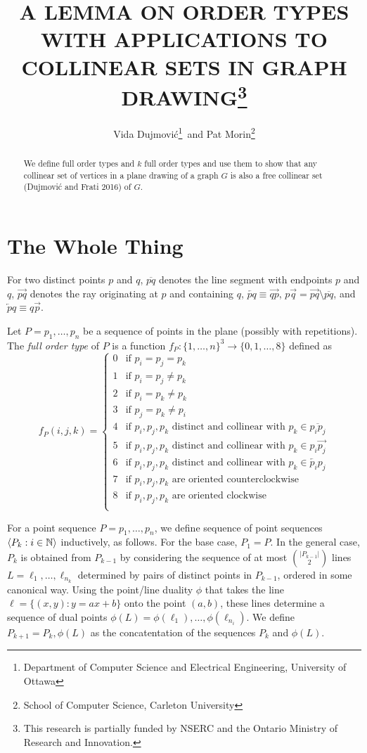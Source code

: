 \documentclass{patmorin}
\title{\MakeUppercase{A Lemma on Order Types with Applications to Collinear Sets in Graph Drawing}\thanks{This research is partially funded by NSERC and the Ontario Ministry of Research and Innovation.}}
\author{Vida Dujmovi\'c\thanks{Department of Computer Science and Electrical Engineering, University of Ottawa}\, and Pat Morin\thanks{School of Computer Science, Carleton University}}
\begin{document}
\maketitle


\begin{abstract}
  We define full order types and $k$ full order types and use them to
  show that any collinear set of vertices in a plane drawing of a graph
  $G$ is also a free collinear set (Dujmovi\'c and Frati 2016) of $G$.
\end{abstract}


\section{The Whole Thing}

For two distinct points $p$ and $q$,
$\overline{pq}$ denotes the line segment with endpoints $p$ and
$q$, $\overrightarrow{pq}$ denotes the ray originating at $p$ and
containing $q$, $\overleftarrow{pq}\equiv \overrightarrow{qp}$, 
$p\!\overrightarrow{q} = \overrightarrow{pq}\setminus \overline{pq}$, 
and $\overleftarrow{p}\!q\equiv q\overrightarrow{p}$.

Let $P=p_1,\ldots,p_n$ be a sequence of points in the plane (possibly
with repetitions).  The \emph{full order type} of $P$ is a function
$f_P\colon \{1,\ldots,n\}^3\to \{0,1,\ldots,8\}$ defined as
\[
   f_P(i,j,k) = 
   \begin{cases}
      0 & \text{if $p_i=p_j=p_k$} \\
      1 & \text{if $p_i=p_j\neq p_k$} \\
      2 & \text{if $p_i=p_k\neq p_k$} \\
      3 & \text{if $p_j=p_k\neq p_i$} \\
      4 & \text{if $p_i,p_j,p_k$ distinct and collinear with $p_k\in\overline{p_ip_j}$} \\
      5 & \text{if $p_i,p_j,p_k$ distinct and collinear with $p_k\in p_i\!\overrightarrow{p_j}$} \\
      6 & \text{if $p_i,p_j,p_k$ distinct and collinear with $p_k\in\overleftarrow{p_i}\!p_j$} \\
      7 & \text{if $p_i,p_j,p_k$ are oriented counterclockwise} \\
      8 & \text{if $p_i,p_j,p_k$ are oriented clockwise} \\
   \end{cases}
\]

For a point sequence $P=p_1,\ldots,p_n$, we define sequence
of point sequences $\langle P_k:i\in \mathbb{N}\rangle$ inductively, as
follows.  For the base case, $P_1=P$. In the general case, $P_{k}$
is obtained from $P_{k-1}$ by considering the sequence of at most
$\binom{|P_{k-1}|}{2}$ lines $L=\ell_1,\ldots,\ell_{n_k}$ determined by
pairs of distinct points in $P_{k-1}$, ordered in some canonical way.
Using the point/line duality $\phi$ that takes the line $\ell=\{(x,y):
y=ax+b\}$ onto the point $(a,b)$, these lines determine a sequence of
dual points $\phi(L)=\phi(\ell_1),\ldots,\phi(\ell_{n_i})$.  We define
$P_{k+1}=P_k,\phi(L)$ as the concatentation of the sequences $P_k$
and $\phi(L)$.
\end{document}
